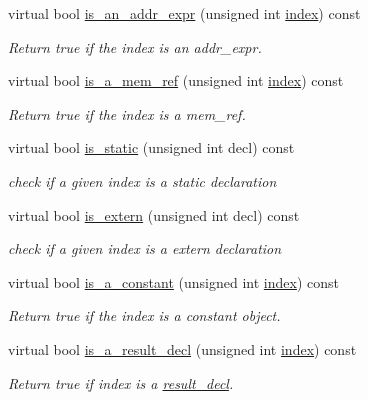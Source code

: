 \begin{DoxyCompactItemize}
virtual bool \hyperlink{classBehavioralHelper_a4127bd7bc6af18101f77ac5f68d6af60}{is\+\_\+an\+\_\+addr\+\_\+expr} (unsigned int \hyperlink{tutorial__pact__2019_2Introduction_2third_2include_2Keccak_8h_a028c9bdc8344cca38ab522a337074797}{index}) const
\begin{DoxyCompactList}\small\item\em Return true if the index is an addr\+\_\+expr. \end{DoxyCompactList}\item 
virtual bool \hyperlink{classBehavioralHelper_af7df51d84377f2c1dbff35b28bd027b6}{is\+\_\+a\+\_\+mem\+\_\+ref} (unsigned int \hyperlink{tutorial__pact__2019_2Introduction_2third_2include_2Keccak_8h_a028c9bdc8344cca38ab522a337074797}{index}) const
\begin{DoxyCompactList}\small\item\em Return true if the index is a mem\+\_\+ref. \end{DoxyCompactList}\item 
virtual bool \hyperlink{classBehavioralHelper_a8195871ec6398c224dfbda443db4855f}{is\+\_\+static} (unsigned int decl) const
\begin{DoxyCompactList}\small\item\em check if a given index is a static declaration \end{DoxyCompactList}\item 
virtual bool \hyperlink{classBehavioralHelper_ab9b583a4859d91a0f4723df348938362}{is\+\_\+extern} (unsigned int decl) const
\begin{DoxyCompactList}\small\item\em check if a given index is a extern declaration \end{DoxyCompactList}\item 
virtual bool \hyperlink{classBehavioralHelper_add58a0a0e9c70eb7c38fd9b65576ca90}{is\+\_\+a\+\_\+constant} (unsigned int \hyperlink{tutorial__pact__2019_2Introduction_2third_2include_2Keccak_8h_a028c9bdc8344cca38ab522a337074797}{index}) const
\begin{DoxyCompactList}\small\item\em Return true if the index is a constant object. \end{DoxyCompactList}\item 
virtual bool \hyperlink{classBehavioralHelper_a200f529a344b5d04ed741e06e542862f}{is\+\_\+a\+\_\+result\+\_\+decl} (unsigned int \hyperlink{tutorial__pact__2019_2Introduction_2third_2include_2Keccak_8h_a028c9bdc8344cca38ab522a337074797}{index}) const
\begin{DoxyCompactList}\small\item\em Return true if index is a \hyperlink{structresult__decl}{result\+\_\+decl}. \end{DoxyCompactList}\item 

\end{DoxyCompactItemize}
